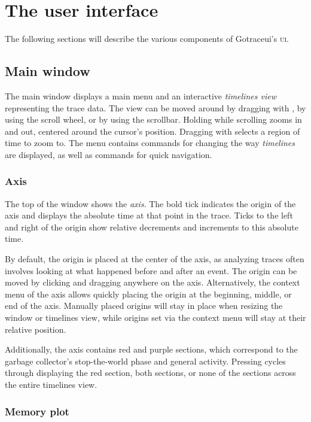 \documentclass[10pt,letterpaper,oneside,openany,english]{memoir}
\newcommand{\noun}[1]{{\emph{#1}}}
\newcommand{\shortcut}{\ctrl{} or \cmdmac}
\begin{document}
\chapter{The user interface}
The following sections will describe the various components of Gotraceui's \textsc{ui}.

\section{Main window}
The main window displays a main menu and an interactive \noun{timelines view} representing the trace data.
The view can be moved around by dragging with , by using the scroll wheel, or by using the scrollbar.
Holding \keys{\shortcut} while scrolling zooms in and out, centered around the cursor's position.
Dragging with \keys{\shortcut + LMB} selects a region of time to zoom to.
The  menu contains commands for changing the way \noun{timelines} are displayed,
as well as commands for quick navigation.

\subsection{Axis}
The top of the window shows the \noun{axis}.
The bold tick indicates the origin of the axis and displays the absolute time at that point in the trace.
Ticks to the left and right of the origin show relative decrements and increments to this absolute time.

By default, the origin is placed at the center of the axis,
as analyzing traces often involves looking at what happened before and after an event.
The origin can be moved by clicking and dragging anywhere on the axis.
Alternatively, the context menu of the axis allows quickly placing the origin at the beginning, middle, or end of the axis.
Manually placed origins will stay in place when resizing the window or timelines view,
while origins set via the context menu will stay at their relative position.

Additionally, the axis contains red and purple sections,
which correspond to the garbage collector's stop-the-world phase and general activity.
Pressing  cycles through displaying the red section, both sections, or none of the sections across the entire timelines view.

\subsection{Memory plot}
\end{document}
